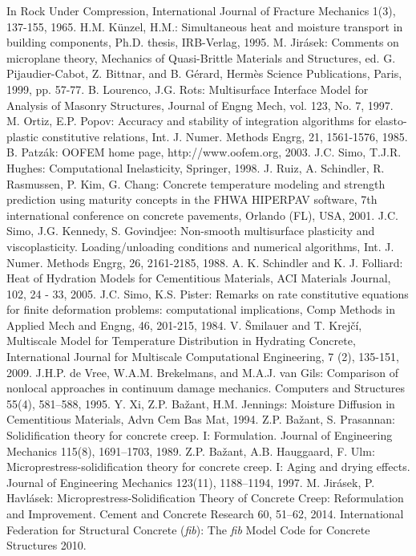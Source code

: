 \documentclass[a4paper]{article}
\begin{document}
\begin{thebibliography}{99}
In Rock Under Compression, International Journal of Fracture Mechanics
1(3), 137-155, 1965.
 H.M. K{\"u}nzel, H.M.: Simultaneous heat and
  moisture transport in building components, Ph.D. thesis, IRB-Verlag,
  1995.
 M. Jir\'{a}sek: Comments on microplane theory, Mechanics of Quasi-Brittle Materials and Structures, ed. G. Pijaudier-Cabot, Z. Bittnar, and B. G\'{e}rard, Herm\`{e}s Science Publications, Paris, 1999, pp. 57-77.
 B. Lourenco, J.G. Rots: Multisurface Interface Model for Analysis of Masonry Structures, Journal of Engng Mech, vol. 123, No. 7, 1997.
 M. Ortiz, E.P. Popov: Accuracy and stability of integration algorithms for elasto-plastic constitutive relations, Int. J. Numer. Methods Engrg, 21, 1561-1576, 1985.
 B. Patz\'ak: OOFEM home page, http://www.oofem.org, 2003.
 J.C. Simo, T.J.R. Hughes: Computational Inelasticity, Springer, 1998.
 J. Ruiz, A. Schindler, R. Rasmussen, P. Kim, G. Chang: Concrete temperature modeling and strength prediction using maturity concepts in the FHWA HIPERPAV software, 7th international conference on concrete pavements, Orlando (FL), USA, 2001.
 J.C. Simo, J.G. Kennedy, S. Govindjee: Non-smooth multisurface plasticity and viscoplasticity. Loading/unloading conditions and numerical algorithms, Int. J. Numer. Methods Engrg, 26, 2161-2185, 1988.
 A. K. Schindler and K. J. Folliard: Heat of Hydration Models for Cementitious Materials, ACI Materials Journal, 102, 24 - 33, 2005.
 J.C. Simo, K.S. Pister: Remarks on rate constitutive equations for finite deformation problems: computational implications, Comp Methods in Applied Mech and Engng, 46, 201-215, 1984.
 V. \v{S}milauer and T. Krej\v{c}\'i, Multiscale
  Model for Temperature Distribution in Hydrating Concrete,
  International Journal for Multiscale Computational Engineering, 7
  (2), 135-151, 2009.
 J.H.P. de Vree, W.A.M. Brekelmans, and M.A.J. van Gils: Comparison of nonlocal approaches in continuum damage mechanics. Computers and Structures 55(4), 581–588, 1995.
 Y. Xi, Z.P. Ba\v{z}ant, H.M. Jennings: Moisture Diffusion
  in Cementitious Materials, Advn Cem Bas Mat, 1994.
 Z.P. Ba\v{z}ant, S. Prasannan: Solidification theory for concrete creep. {I}: Formulation. Journal of Engineering Mechanics 115(8), 1691–1703, 1989.
 Z.P. Ba\v{z}ant, A.B. Hauggaard, F. Ulm: Microprestress-solidification theory for concrete creep. {I}: Aging and drying effects. Journal of Engineering Mechanics 123(11), 1188–1194, 1997.
 M. Jir\'{a}sek, P. Havl\'{a}sek: Microprestress-Solidification Theory of Concrete Creep: Reformulation and Improvement. Cement and Concrete Research 60, 51–62, 2014.
 International Federation for Structural Concrete (\textit{fib}): The \textit{fib} Model Code for Concrete Structures 2010.

\end{thebibliography}
\end{document}
